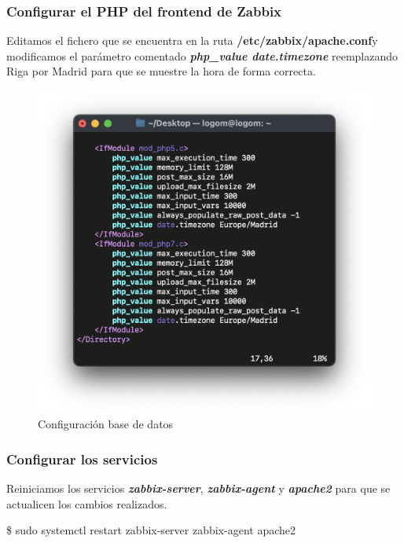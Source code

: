     \subsubsection{Configurar el PHP del frontend de Zabbix}
    Editamos el fichero que se encuentra en la ruta \textbf{/etc/zabbix/apache.conf}y modificamos el parámetro comentado \textbf{\emph{php\_value date.timezone}} reemplazando Riga
    por Madrid para que se muestre la hora de forma correcta.
    \begin{figure}[H]
        \centering
        \includegraphics[scale=0.5]{images/apache_conf.png}
        \caption{Configuración base de datos}
        \label{fig:apache_conf}
    \end{figure}

    \subsubsection{Configurar los servicios}
    Reiniciamos los servicios \textbf{\emph{zabbix-server}}, \textbf{\emph{zabbix-agent}} y \textbf{\emph{apache2}} para que se actualicen los cambios realizados.
        \begin{tcolorbox}[colback=black!10, halign=left]
            \$ sudo systemctl restart zabbix-server zabbix-agent apache2
        \end{tcolorbox}

